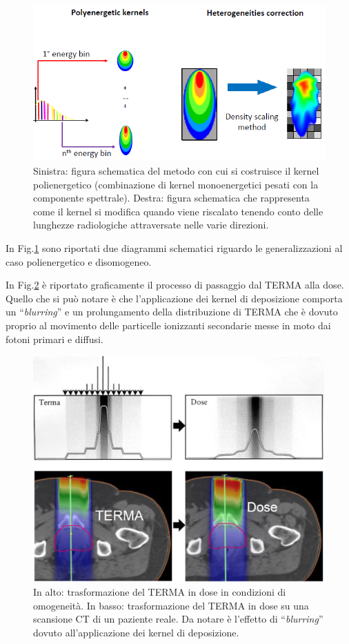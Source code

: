 {\begin{figure}
\centering
\includegraphics[width=\textwidth]{./cap1/kern_trans.png}
\caption{Sinistra: figura schematica del metodo con cui si costruisce il kernel polienergetico (combinazione di kernel monoenergetici pesati con la componente spettrale). Destra: figura schematica che rappresenta come il kernel si modifica quando viene riscalato tenendo conto delle lunghezze radiologiche attraversate nelle varie direzioni.}
\label{fig:kern_trans}
\end{figure}

In Fig.\ref{fig:kern_trans} sono riportati due diagrammi schematici riguardo le generalizzazioni al caso polienergetico e disomogeneo.


In Fig.\ref{fig:terma_dose} è riportato graficamente il processo di passaggio dal TERMA alla dose. Quello che si può notare è che l'applicazione dei kernel di deposizione comporta un \textquotedblleft\textit{blurring}\textquotedblright{} e un prolungamento della distribuzione di TERMA che è dovuto proprio al movimento delle particelle ionizzanti secondarie messe in moto dai fotoni primari e diffusi.
\begin{figure}
\centering
\includegraphics[width=.8\textwidth]{./cap1/terma_dose.png}
\caption{In alto: trasformazione del TERMA in dose in condizioni di omogeneità. In basso: trasformazione del TERMA in dose su una scansione CT di un paziente reale. Da notare è l'effetto di \textquotedblleft\textit{blurring}\textquotedblright{} dovuto all'applicazione dei kernel di deposizione.}
\label{fig:terma_dose}
\end{figure}



}
